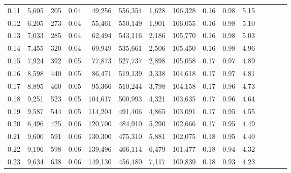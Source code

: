 \begin{tabular}{rrrcrrrrrrrrrrr}
0.11 &   5,605 &    205 &                                       0.04 &   49,256 &  556,354 &    1,628 &  106,328 &  0.16 &  0.98 &                         5.15 \\
0.12 &   6,205 &    273 &                                       0.04 &   55,461 &  550,149 &    1,901 &  106,055 &  0.16 &  0.98 &                         5.10 \\
0.13 &   7,033 &    285 &                                       0.04 &   62,494 &  543,116 &    2,186 &  105,770 &  0.16 &  0.98 &                         5.03 \\
0.14 &   7,455 &    320 &                                       0.04 &   69,949 &  535,661 &    2,506 &  105,450 &  0.16 &  0.98 &                         4.96 \\
0.15 &   7,924 &    392 &                                       0.05 &   77,873 &  527,737 &    2,898 &  105,058 &  0.17 &  0.97 &                         4.89 \\
0.16 &   8,598 &    440 &                                       0.05 &   86,471 &  519,139 &    3,338 &  104,618 &  0.17 &  0.97 &                         4.81 \\
0.17 &   8,895 &    460 &                                       0.05 &   95,366 &  510,244 &    3,798 &  104,158 &  0.17 &  0.96 &                         4.73 \\
0.18 &   9,251 &    523 &                                       0.05 &  104,617 &  500,993 &    4,321 &  103,635 &  0.17 &  0.96 &                         4.64 \\
0.19 &   9,587 &    544 &                                       0.05 &  114,204 &  491,406 &    4,865 &  103,091 &  0.17 &  0.95 &                         4.55 \\
0.20 &   6,496 &    425 &                                       0.06 &  120,700 &  484,910 &    5,290 &  102,666 &  0.17 &  0.95 &                         4.49 \\
0.21 &   9,600 &    591 &                                       0.06 &  130,300 &  475,310 &    5,881 &  102,075 &  0.18 &  0.95 &                         4.40 \\
0.22 &   9,196 &    598 &                                       0.06 &  139,496 &  466,114 &    6,479 &  101,477 &  0.18 &  0.94 &                         4.32 \\
0.23 &   9,634 &    638 &                                       0.06 &  149,130 &  456,480 &    7,117 &  100,839 &  0.18 &  0.93 &                         4.23 \\

\end{tabular}
